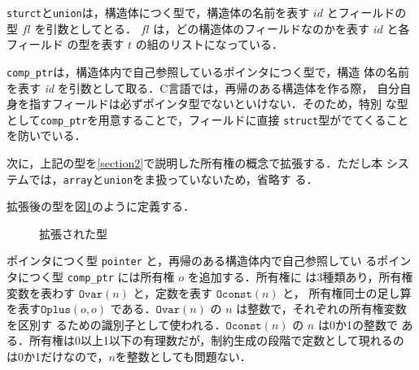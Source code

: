 \texttt{sturct}と\texttt{union}は，構造体につく型で，構造体の名前を表す
$\mathit{id}$ とフィールドの型 $\mathit{fl}$ を引数としてとる．
$\mathit{fl}$ は，どの構造体のフィールドなのかを表す $\mathit{id}$ と各フィールド
の型を表す $t$ の組のリストになっている．

\texttt{comp\_ptr}は，構造体内で自己参照しているポインタにつく型で，構造
体の名前を表す \textit{id} を引数として取る．C言語では，再帰のある構造体を作る際，
自分自身を指すフィールドは必ずポインタ型でないといけない．そのため，特別
な型として\texttt{comp\_ptr}を用意することで，フィールドに直接
\texttt{struct}型がでてくることを防いでいる．

次に，上記の型を\ref{section2}で説明した所有権の概念で拡張する．ただし本
システムでは，\texttt{array}と\texttt{union}をま扱っていないため，省略す
る．

\begin{definition}[型]
  拡張後の型を図\ref{extend_clight_type}のように定義する．
\end{definition}
\begin{figure}[htbp]
  \centering
  \caption{拡張された型}
  \label{extend_clight_type}
\end{figure}

ポインタにつく型 \texttt{pointer} と，再帰のある構造体内で自己参照してい
るポインタにつく型 \texttt{comp\_ptr} には所有権 $o$ を追加する．所有権に
は3種類あり，所有権変数を表わす $\texttt{Ovar}(n)$ と，定数を表す
$\texttt{Oconst}(n)$ と， 所有権同士の足し算を表す$\texttt{Oplus}(o, o)$
である．$\texttt{Ovar}(n)$ の $n$ は整数で，それぞれの所有権変数を区別す
るための識別子として使われる．$\texttt{Oconst}(n)$ の $n$ は0か1の整数で
ある．所有権は0以上1以下の有理数だが，制約生成の段階で定数として現れるの
は0か1だけなので，$n$を整数としても問題ない．

